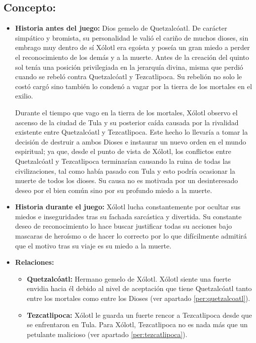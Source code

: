 \subsection{Concepto:}
\begin{itemize}
	\item \textbf{Historia antes del juego:}
	Dios gemelo de Quetzalcóatl. De carácter simpático y bromista, su personalidad le valió el cariño de muchos dioses, sin embrago muy dentro de sí Xólotl era egoísta y poseía un gran miedo a perder el reconocimiento de los demás y a la muerte. Antes de la creación del quinto sol tenía una posición privilegiada en la jerarquía divina, misma que perdió cuando se rebeló contra Quetzalcóatl y Tezcatlipoca. Su rebelión no solo le costó cargó sino también lo condenó a vagar por la tierra de los mortales en el exilio.
	\\ 
	\par 
	Durante el tiempo que vago en la tierra de los mortales, Xólotl observo el ascenso de la ciudad de Tula  y su posterior caída causada por la rivalidad existente entre Quetzalcóatl y Tezcatlipoca. Este hecho lo llevaría a tomar la decisión de destruir a ambos Dioses e instaurar un nuevo orden en el mundo espiritual; ya que, desde el punto de vista de Xólotl, los conflictos entre Quetzalcóatl y Tezcatlipoca terminarían causando la ruina de todas las civilizaciones, tal como había pasado con Tula y esto podría ocasionar la muerte de todos los dioses. Su causa no es motivada por un desinteresado deseo por el bien común sino por su profundo miedo a la muerte. 
	\item \textbf{Historia durante el juego:}
	Xólotl lucha constantemente por ocultar sus miedos e inseguridades tras su fachada sarcástica y divertida. Su constante deseo de reconocimiento lo hace buscar justificar todas su acciones bajo mascaras de heroísmo o de hacer lo correcto por lo que difícilmente admitirá que el motivo tras su viaje es su miedo a la muerte. 
	\item \textbf{Relaciones:}
	\begin{itemize}
		\item \textbf{Quetzalcóatl:} Hermano gemelo de Xólotl. Xólotl siente una fuerte envidia hacia él debido al nivel de aceptación que tiene Quetzalcóatl tanto entre los mortales como entre los Dioses (ver apartado \ref{per:quetzalcoatl}).
		\item \textbf{Tezcatlipoca:} Xólotl le guarda un fuerte rencor a Tezcatlipoca desde que se enfrentaron en Tula. Para Xólotl, Tezcatlipoca no es nada más que un petulante malicioso (ver apartado \ref{per:tezcatlipoca}). 
		

\end{itemize}
\end{itemize}
